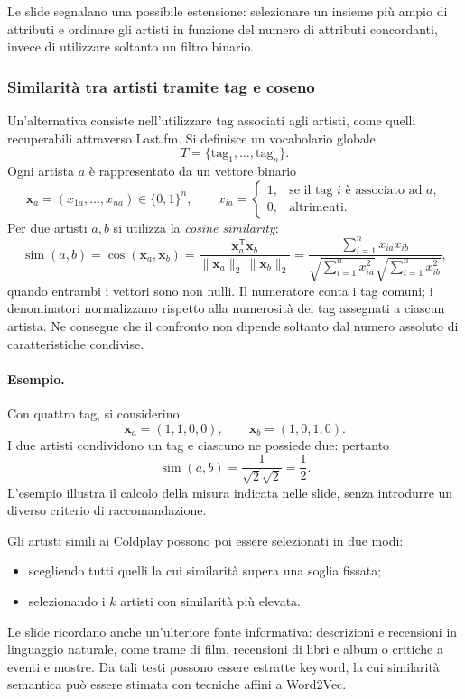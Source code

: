 Le slide segnalano una possibile estensione: selezionare un insieme più ampio di attributi e ordinare gli artisti in funzione del numero di attributi concordanti, invece di utilizzare soltanto un filtro binario.

\subsubsection{Similarità tra artisti tramite tag e coseno}
Un'alternativa consiste nell'utilizzare tag associati agli artisti, come quelli recuperabili attraverso Last.fm. Si definisce un vocabolario globale
\[
T=\{\mathrm{tag}_1,\ldots,\mathrm{tag}_n\}.
\]
Ogni artista $a$ è rappresentato da un vettore binario
\[
\mathbf{x}_a=(x_{1a},\ldots,x_{na})\in\{0,1\}^{n},
\qquad
x_{ia}=\begin{cases}
1,&\text{se il tag $i$ è associato ad $a$},\\
0,&\text{altrimenti}.
\end{cases}
\]
Per due artisti $a,b$ si utilizza la \emph{cosine similarity}:
\[
\operatorname{sim}(a,b)
=\cos(\mathbf{x}_a,\mathbf{x}_b)
=\frac{\mathbf{x}_a^{\mathsf T}\mathbf{x}_b}
{\|\mathbf{x}_a\|_2\,\|\mathbf{x}_b\|_2}
=\frac{\sum_{i=1}^{n}x_{ia}x_{ib}}
{\sqrt{\sum_{i=1}^{n}x_{ia}^{2}}\sqrt{\sum_{i=1}^{n}x_{ib}^{2}}},
\]
quando entrambi i vettori sono non nulli. Il numeratore conta i tag comuni; i denominatori normalizzano rispetto alla numerosità dei tag assegnati a ciascun artista. Ne consegue che il confronto non dipende soltanto dal numero assoluto di caratteristiche condivise.

\paragraph{Esempio.} Con quattro tag, si considerino
\[
\mathbf{x}_a=(1,1,0,0),\qquad \mathbf{x}_b=(1,0,1,0).
\]
I due artisti condividono un tag e ciascuno ne possiede due: pertanto
\[
\operatorname{sim}(a,b)=\frac{1}{\sqrt{2}\sqrt{2}}=\frac12.
\]
L'esempio illustra il calcolo della misura indicata nelle slide, senza introdurre un diverso criterio di raccomandazione.

Gli artisti simili ai Coldplay possono poi essere selezionati in due modi:
\begin{itemize}
    \item scegliendo tutti quelli la cui similarità supera una soglia fissata;
    \item selezionando i $k$ artisti con similarità più elevata.
\end{itemize}
Le slide ricordano anche un'ulteriore fonte informativa: descrizioni e recensioni in linguaggio naturale, come trame di film, recensioni di libri e album o critiche a eventi e mostre. Da tali testi possono essere estratte keyword, la cui similarità semantica può essere stimata con tecniche affini a Word2Vec.


